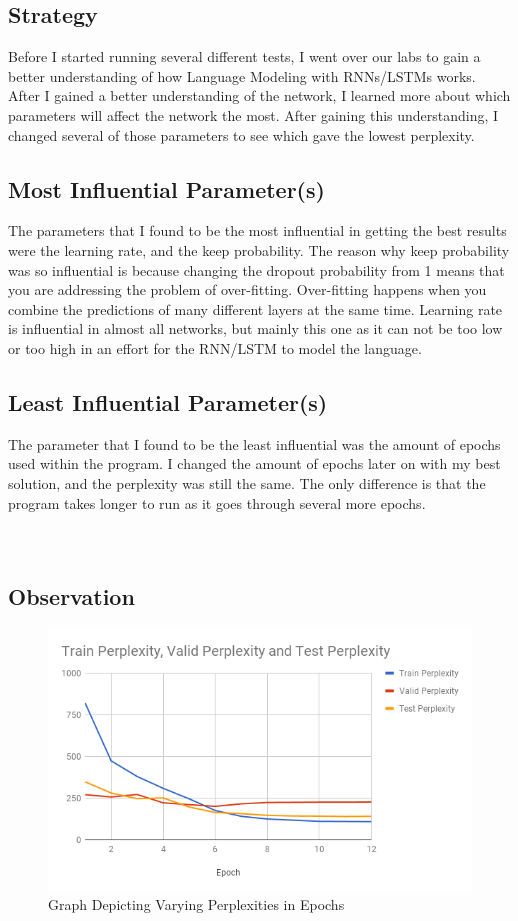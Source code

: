 \documentclass[a4paper]{article}
\begin{document}
\subsection{Strategy}
Before I started running several different tests, I went over our labs to gain a better understanding of how Language Modeling with RNNs/LSTMs works. After I gained a better understanding of the network, I learned more about which parameters will affect the network the most. After gaining this understanding, I changed several of those parameters to see which gave the lowest perplexity. 

\subsection{Most Influential Parameter(s)}
The parameters that I found to be the most influential in getting the best results were the learning rate, and the keep probability. The reason why keep probability was so influential is because changing the dropout probability from 1 means that you are addressing the problem of over-fitting. Over-fitting happens when you combine the predictions of many different layers at the same time. Learning rate is influential in almost all networks, but mainly this one as it can not be too low or too high in an effort for the RNN/LSTM to model the language. 

\subsection{Least Influential Parameter(s)}
The parameter that I found to be the least influential was the amount of epochs used within the program. I changed the amount of epochs later on with my best solution, and the perplexity was still the same. The only difference is that the program takes longer to run as it goes through several more epochs. \\ \\ \\

\subsection{Observation}
\begin{figure}[!h]
  \includegraphics[width=\linewidth]{chart.png}
  \caption{Graph Depicting Varying Perplexities in Epochs}
  \label{fig}
\end{figure}
\end{document}
